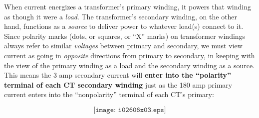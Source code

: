 \vskip 40pt

When current energizes a transformer's primary winding, it powers that winding as though it were a {\it load}.  The transformer's secondary winding, on the other hand, functions as a {\it source} to deliver power to whatever load(s) connect to it.  Since polarity marks (dots, or squares, or ``X'' marks) on transformer windings always refer to similar {\it voltages} between primary and secondary, we must view current as going in {\it opposite} directions from primary to secondary, in keeping with the view of the primary winding as a load and the secondary winding as a source.  This means the 3 amp secondary current will {\bf enter into the ``polarity'' terminal of each CT secondary winding} just as the 180 amp primary current enters into the ``nonpolarity'' terminal of each CT's primary:

$$\texttt{[image: i02606x03.eps]}$$




